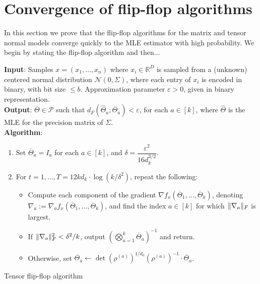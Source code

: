 \documentclass{article}
\DeclarePairedDelimiter{\norm}{\lVert}{\rVert}
\newcommand{\R}{{\mathbb{R}}}
\newcommand{\otheta}{\overline{\Theta}}
\newcommand{\htheta}{\hat{\Theta}}
\newcommand\eps{\varepsilon}
\newcommand\cN{\mathcal{N}}
\newcommand\SPD{\mathcal{P}}
\newcommand\samp{x}
\begin{document}



\newpage
\section{Convergence of flip-flop algorithms}

In this section we prove that the flip-flop algorithms for the matrix and tensor normal models converge quickly to the MLE estimator with high probability. We begin by stating the flip-flop algorithm and then... 

\begin{Algorithm}
\textbf{Input}: Samples $\samp = (\samp_1, \ldots, \samp_n)$ where $\samp_i \in \R^D$ is sampled from a (unknown) centered normal distribution $\cN(0, \Sigma)$, where each entry of $\samp_i$ is encoded in binary, with bit size $\le b$. Approximation parameter $\eps > 0$, given in binary representation. \\[.3ex]

\textbf{Output}: $\otheta \in \SPD$ such that $d_F(\htheta_a; \otheta_a) < \eps$, for each $a \in [k]$, where $\htheta$ is the MLE for the precision matrix of $\Sigma$. \\[.3ex]

\textbf{Algorithm}:
\begin{enumerate}
\item\label{it:flip-flop step 1} Set $\otheta_a = I_a$ for each $a \in [k]$, and $\delta = \dfrac{\eps^2}{16 d_k^{3/2}}$.
\item\label{it:flip-flop step 2} For $t=1,\dots,T = 12 k d_k \cdot \log(k/\delta^2)$, repeat the following:
\begin{itemize}
\item Compute each component of the gradient $\nabla f_{\samp}(\otheta_1, \ldots, \otheta_k)$, denoting $\nabla_a := \nabla_a f_{\samp}(\otheta_1, \ldots, \otheta_k)$, and find the index $a \in [k]$ for which $\norm{\nabla_a}_F$ is largest. 
\item
If $\norm{\nabla_a}_F^2 < \delta^2/k$, output $\left( \bigotimes_{a =1}^k \otheta_a \right)^{-1}$ and return.
\item Otherwise, set $\otheta_a \leftarrow \det(\rho^{(a)})^{1/d_a} (\rho^{(a)})^{-1} \cdot \otheta_a$.
\end{itemize}
\end{enumerate}
\caption{Tensor flip-flop algorithm}\label{alg:flip-flop}
\end{Algorithm}
\end{document}
